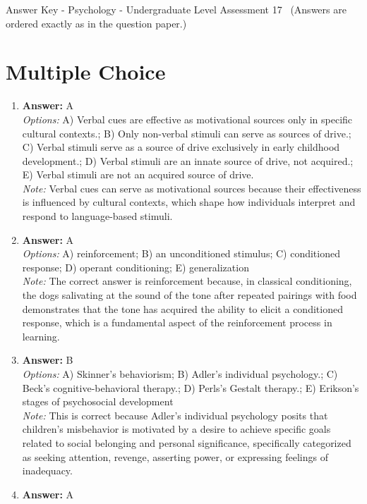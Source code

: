 \documentclass[12pt]{article}
\begin{document}
\begin{center}
Answer Key - Psychology - Undergraduate Level Assessment 17 \
\small (Answers are ordered exactly as in the question paper.)
\end{center}

\section*{Multiple Choice}
\begin{enumerate}[label=\arabic*.]
\item \textbf{Answer:} A
\\ \textit{Options:} A) Verbal cues are effective as motivational sources only in specific cultural contexts.; B) Only non-verbal stimuli can serve as sources of drive.; C) Verbal stimuli serve as a source of drive exclusively in early childhood development.; D) Verbal stimuli are an innate source of drive, not acquired.; E) Verbal stimuli are not an acquired source of drive.
\\ \textit{Note:} Verbal cues can serve as motivational sources because their effectiveness is influenced by cultural contexts, which shape how individuals interpret and respond to language-based stimuli.
\item \textbf{Answer:} A
\\ \textit{Options:} A) reinforcement; B) an unconditioned stimulus; C) conditioned response; D) operant conditioning; E) generalization
\\ \textit{Note:} The correct answer is reinforcement because, in classical conditioning, the dogs salivating at the sound of the tone after repeated pairings with food demonstrates that the tone has acquired the ability to elicit a conditioned response, which is a fundamental aspect of the reinforcement process in learning.
\item \textbf{Answer:} B
\\ \textit{Options:} A) Skinner's behaviorism; B) Adler's individual psychology.; C) Beck's cognitive-behavioral therapy.; D) Perls's Gestalt therapy.; E) Erikson's stages of psychosocial development
\\ \textit{Note:} This is correct because Adler's individual psychology posits that children's misbehavior is motivated by a desire to achieve specific goals related to social belonging and personal significance, specifically categorized as seeking attention, revenge, asserting power, or expressing feelings of inadequacy.
\item \textbf{Answer:} A

\end{enumerate}
\end{document}

